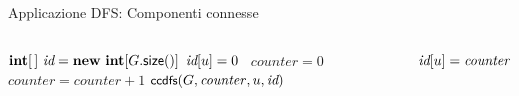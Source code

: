 \begin{frame}{Applicazione DFS: Componenti connesse}

\vspace{-12pt}
\begin{columns}[T]
\begin{Procedure}
\caption[A]{$\INTEGER[\,]$ \connectedcomponents(\Graph $G$)}
$\INTEGER[\,]\ \components = \NEW\ \INTEGER[G.\textsf{size}()]$\;
{
  $\textit{id}[u] = 0$
}
\INTEGER\ $\mathit{counter} = 0$\;
{
  {
    $\mathit{counter} = \mathit{counter}+1$\;
    $\textsf{{\small ccdfs}}(G, \mathit{counter}, u, \textit{id})$\;
  }
}
\Return \components\;
\end{Procedure}
\begin{Procedure}
\caption[A]{\ccdfs(\Graph $G$, \INTEGER\ $\mathit{counter}$, \Node\ $u$, $\INTEGER[\,]\ \components$)}
$\textit{id}[u] = \mathit{counter}$\;
{
}
\end{Procedure}
\end{columns}
\end{frame}



